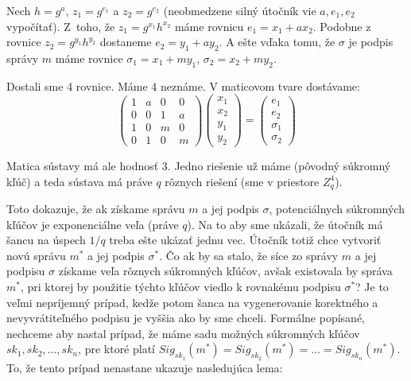 \begin{dokaz}
    Nech $h = g^a$, $z_1 = g^{e_1}$ a $z_2 = g^{e_2}$ 
    (neobmedzene silný útočník vie $a, e_1, e_2$ vypočítať).
    Z~toho, že $z_1 = g^{x_1} h^{x_2}$ máme rovnicu $e_1 = x_1 + ax_2$.
    Podobne z rovnice $z_2 = g^{y_1} h^{y_2}$ dostaneme $e_2 = y_1 + a y_2$.
    A ešte vďaka tomu, že $\sigma$ je podpis správy $m$ máme rovnice
    $\sigma_1 = x_1 + my_1$, $\sigma_2 = x_2 + my_2$. 

    Dostali sme 4 rovnice. Máme 4 neznáme. V maticovom tvare dostávame:
    \begin{equation*}
        \left ( \begin{matrix}
                    1 & a & 0 & 0 \\
                    0 & 0 & 1 & a \\
                    1 & 0 & m & 0 \\
                    0 & 1 & 0 & m
                \end{matrix}
        \right )
        \left ( \begin{matrix}
                    x_1 \\
                    x_2 \\
                    y_1 \\
                    y_2
                \end{matrix}
        \right )
        =
        \left ( \begin{matrix} 
                    e_1 \\
                    e_2 \\
                    \sigma_1\\
                    \sigma_2
                \end{matrix}
        \right )
    \end{equation*}

    Matica sústavy má ale hodnosť $3$. Jedno riešenie už máme (pôvodný
    súkromný kľúč) a teda sústava má práve $q$ rôznych riešení (sme v
    priestore $Z_q^4$).
\end{dokaz}

Toto dokazuje, že ak získame správu $m$ a jej podpis $\sigma$,
potenciálnych súkromných kľúčov je exponenciálne veľa (práve $q$).
Na to aby sme ukázali, že útočník má šancu na úspech $1/q$ 
treba ešte ukázať jednu vec.
Útočník totiž chce vytvoriť novú správu $m^*$ a jej podpis $\sigma^*$.
Čo ak by sa stalo, že síce zo správy $m$ a jej podpisu $\sigma$
získame veľa rôznych súkromných kľúčov, avšak existovala by správa
$m^*$, pri ktorej by použitie týchto kľúčov viedlo k rovnakému podpisu 
$\sigma^*$? Je to veľmi nepríjemný prípad, kedže potom šanca na
vygenerovanie korektného a nevyvrátiteľného podpisu je vyššia ako by
sme chceli.
Formálne popísané, nechceme aby nastal prípad, že máme sadu možných súkromných
kľúčov $sk_1, sk_2, \dots, sk_n$, pre ktoré platí
$Sig_{sk_1}(m^*) = Sig_{sk_2}(m^*) = \dots = Sig_{sk_n}(m^*)$.
To, že tento prípad nenastane ukazuje nasledujúca lema:

